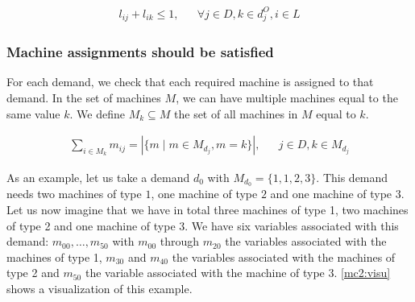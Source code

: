 \documentclass[../../thesis.tex]{subfiles}
\begin{document}
\begin{align}
  l_{ij} + l_{ik} \leq 1, && \forall j \in D, k \in d^O_j, i \in L \label{lc3}
\end{align}


\subsubsection{Machine assignments should be satisfied}

For each demand, we check that each required machine is assigned to that demand.
In the set of machines $M$, we can have multiple machines equal to the same value $k$.
We define $M_k \subseteq M$ the set of all machines in $M$ equal to $k$.

\begin{align}
  \sum_{i \in M_k} m_{ij} = | \{ m \mid m \in M_{d_j}, m = k \} |, && j \in D, k \in M_{d_j} \label{mc2}
\end{align}


As an example, let us take a demand $d_0$ with $M_{d_0} = \{ 1, 1, 2, 3 \}$. This demand needs 
two machines of type $1$, one machine of type $2$ and one machine of type $3$.
Let us now imagine that we have in total three machines of type 1, two machines of type 2 and one machine of type 3.
We have six variables associated with this demand: $m_{00}, \dots, m_{50}$ with 
$m_{00}$ through $m_{20}$ the variables associated with the machines of type 1, $m_{30}$ and $m_{40}$ the variables 
associated with the machines of type 2 and $m_{50}$ the variable associated with the machine of type 3.
\autoref{mc2:visu} shows a visualization of this example.
\end{document}

